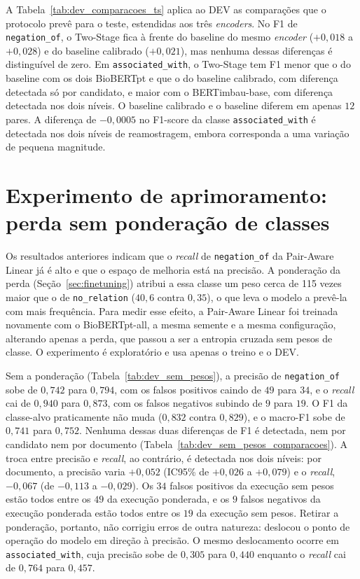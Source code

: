 A Tabela~\ref{tab:dev_comparacoes_ts} aplica ao DEV as comparações que o protocolo
prevê para o teste, estendidas aos três \emph{encoders}. No F1 de
\texttt{negation\_of}, o Two-Stage fica à frente do baseline do mesmo
\emph{encoder} ($+0{,}018$ a $+0{,}028$) e do baseline calibrado ($+0{,}021$), mas
nenhuma dessas diferenças é distinguível de zero. Em \texttt{associated\_with}, o
Two-Stage tem F1 menor que o do baseline com os dois BioBERTpt e que o do baseline
calibrado, com diferença detectada só por candidato, e maior com o BERTimbau-base,
com diferença detectada nos dois níveis. O baseline calibrado e o baseline diferem em apenas $12$ pares. A diferença de $-0{,}0005$ no F1-score da classe \texttt{associated\_with} é detectada nos dois níveis de reamostragem, embora corresponda a uma variação de pequena magnitude.



\section{Experimento de aprimoramento: perda sem ponderação de classes}
\label{sec:resultados_sem_pesos}

Os resultados anteriores indicam que o \emph{recall} de \texttt{negation\_of} da
Pair-Aware Linear já é alto e que o espaço de melhoria está na precisão. A ponderação da perda (Seção~\ref{sec:finetuning}) atribui a essa classe um peso cerca de 115 vezes maior que o de \texttt{no\_relation} ($40{,}6$ contra $0{,}35$), o que
leva o modelo a prevê-la com mais frequência. Para medir esse efeito, a Pair-Aware
Linear foi treinada novamente com o BioBERTpt-all, a mesma semente e a mesma
configuração, alterando apenas a perda, que passou a ser a entropia cruzada sem
pesos de classe. O experimento é exploratório e usa apenas o treino e o DEV.



Sem a ponderação (Tabela~\ref{tab:dev_sem_pesos}), a precisão de
\texttt{negation\_of} sobe de $0{,}742$ para $0{,}794$, com os falsos positivos
caindo de $49$ para $34$, e o \emph{recall} cai de $0{,}940$ para $0{,}873$, com os
falsos negativos subindo de $9$ para $19$. O F1 da classe-alvo praticamente não
muda ($0{,}832$ contra $0{,}829$), e o macro-F1 sobe de $0{,}741$ para $0{,}752$.
Nenhuma dessas duas diferenças de F1 é detectada, nem por candidato nem por documento
(Tabela~\ref{tab:dev_sem_pesos_comparacoes}). A troca entre precisão e \emph{recall},
ao contrário, é detectada nos dois níveis: por documento, a precisão varia
$+0{,}052$ (IC95\% de $+0{,}026$ a $+0{,}079$) e o \emph{recall}, $-0{,}067$ (de
$-0{,}113$ a $-0{,}029$). Os $34$
falsos positivos da execução sem pesos estão todos entre os $49$ da execução
ponderada, e os $9$ falsos negativos da execução ponderada estão todos entre os $19$
da execução sem pesos. Retirar a ponderação, portanto, não corrigiu erros de outra
natureza: deslocou o ponto de operação do modelo em direção à precisão. O mesmo
deslocamento ocorre em \texttt{associated\_with}, cuja precisão sobe de $0{,}305$
para $0{,}440$ enquanto o \emph{recall} cai de $0{,}764$ para $0{,}457$.

